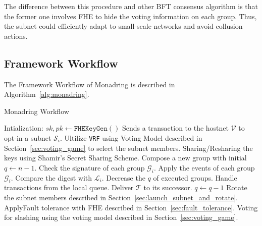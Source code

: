 \documentclass[11pt]{article}
\begin{document}
The difference between this procedure and other BFT consensus algorithm is that the former one involves FHE to hide the voting information on each group.
Thus, the subnet could efficiently adapt to small-scale networks and avoid collusion actions.



\subsection{Framework Workflow}
\label{sec:framework_workflow}
The Framework Workflow of Monadring is described in Algorithm~\ref{alg:monadring}.
\begin{algorithm}
	\caption{Monadring Workflow}
  \label{alg:monadring}
	\begin{algorithmic}[1]
		\State Intialization: $sk, pk \leftarrow \texttt{FHEKeyGen}()$
    \State Sends a transaction to the hostnet $\mathcal{V}$ to opt-in a subnet $\mathcal{S}_i$.
    \State Ultilize \texttt{VRF} using Voting Model described in Section~\ref{sec:voting_game} to select the subnet members.
      \State Sharing/Resharing the keys using Shamir's Secret Sharing Scheme.
      \State Compose a new group with initial $q\leftarrow n-1$.
          \State Check the signature of each group $\mathcal{G}_i$.
          \State Apply the events of each group $\mathcal{G}_i$.
          \State Compare the digest with $\mathcal{L}_i$.
          \State Decrease the $q$ of executed groups.
          \State Handle transactions from the local queue.
          \State Deliver $\mathcal{T}$ to its successor.
          \State $q \leftarrow q - 1$
        \EndIf
      \EndWhile
      \State Rotate the subnet members described in Section~\ref{sec:launch_subnet_and_rotate}.
        \State ApplyFault tolerance with FHE described in Section~\ref{sec:fault_tolerance}.
        \State Voting for slashing using the voting model described in Section~\ref{sec:voting_game}.
      \EndIf
		\EndFor
	\end{algorithmic}
  \end{algorithm}


\end{document}
